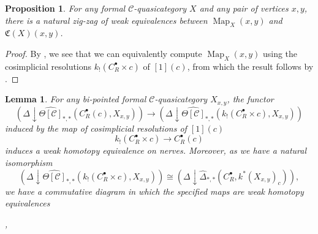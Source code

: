 \documentclass[a4paper]{article}
\numberwithin{equation}{subsection}
\theoremstyle{plain}   %
\newtheorem{prop}[equation]{Proposition}
\newtheorem{lemma}[equation]{Lemma}
\theoremstyle{definition}
\theoremstyle{remark}
\theoremstyle{plain}
\DeclareMathOperator*{\coliml}{colim}
\newcommand{\overcat}[2]{{\left(#1\downarrow #2\right)}}
\DeclareMathOperator{\Map}{Map}
\DeclareMathOperator*{\hocoliml}{hocolim}
\newcommand{\psh}[1]{\ensuremath{\widehat{#1}}}
\providecommand{\C}{}
\renewcommand{\C}{\ensuremath{\mathcal{C}}}
\newcommand{\cellset}{\ensuremath{\widehat{\Theta[\mathcal{C}]}}}
\begin{document}
\begin{prop}\label{mapspacecomparison}
  For any formal \(\C\)-quasicategory \(X\) and any pair of vertices \(x,y\), there is a natural zig-zag of weak equivalences between \(\Map_X(x,y)\) and \(\mathfrak{C}(X)(x,y)\).
\end{prop}
\begin{proof}
	By , we see that we can equivalently compute \(\Map_X(x,y)\) using the cosimplicial resolutions \(k_!(C^\bullet_R\times c)\) of \([1](c)\), from which the result follows by .
\end{proof}

\begin{lemma}\label{dssquare1}
	For any bi-pointed formal \(\C\)-quasicategory \(X_{x,y}\), the functor
	\[\overcat{\Delta}{\cellset_{\ast,\ast}(C^\bullet_R(c), X_{x,y})} \to \overcat{\Delta}{\cellset_{\ast,\ast}(k_!(C^\bullet_R\times c), X_{x,y})}\]
	induced by the map of cosimplicial resolutions of \([1](c)\)
	\[k_!(C^\bullet_R\times c) \to C^\bullet_R(c)\]
	induces a weak homotopy equivalence on nerves.  Moreover, as we have a natural isomorphism
	\[\overcat{\Delta}{\cellset_{\ast,\ast}(k_!(C^\bullet_R\times c), X_{x,y})}\cong \overcat{\Delta}{\psh{\Delta}_{\ast,\ast}(C^\bullet_R, k^\ast(X_{x,y})_c)},\]
	we have a commutative diagram in which the specified maps are weak homotopy equivalences
	\begin{center}
		,
	\end{center}
\end{lemma}
\end{document}
